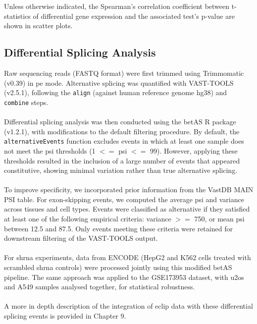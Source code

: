 Unless otherwise indicated, the Spearman's correlation coefficient between t-statistics of differential gene expression and the associated test's p-value are shown in scatter plots.

\subsection{Differential Splicing Analysis}

Raw sequencing reads (FASTQ format) were first trimmed using Trimmomatic (v0.39)\cite{bolger_trimmomatic_2014} in \gls{pe} mode. Alternative splicing was quantified with VAST-TOOLS (v2.5.1)\cite{tapial_atlas_2017}, following the \texttt{align} (against human reference genome hg38) and \texttt{combine} steps.
\\
\\
Differential splicing analysis was then conducted using the betAS R package (v1.2.1)\cite{ascensao-ferreira_betas_2024}, with modifications to the default filtering procedure. By default, the \texttt{alternative\allowbreak Events} function excludes events in which at least one sample does not meet the \gls{psi} thresholds (1 $<=$ \gls{psi} $<=$ 99). However, applying these thresholds resulted in the inclusion of a large number of events that appeared constitutive, showing minimal variation rather than true alternative splicing.
\\
\\
To improve specificity, we incorporated prior information from the VastDB MAIN PSI table\cite{tapial_atlas_2017}. For exon-skipping events, we computed the average \gls{psi} and variance across tissues and cell types. Events were classified as alternative if they satisfied at least one of the following empirical criteria: variance $>=$ 750, or mean \gls{psi} between 12.5 and 87.5. Only events meeting these criteria were retained for downstream filtering of the VAST-TOOLS output.
\\
\\
For \gls{shrna} experiments, data from ENCODE (HepG2 and K562 cells treated with scrambled \gls{shrna} controls)\cite{the_encode_project_consortium_integrated_2012} were processed jointly using this modified betAS pipeline. The same approach was applied to the GSE173953 dataset, with \gls{u2os} and A549 samples analysed together, for statistical robustness.
\\
\\
A more in depth description of the integration of \gls{eclip} data with these differential splicing events is provided in Chapter 9.

